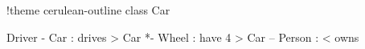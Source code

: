 \documentclass{scrartcl}
\begin{document}
\begin{plantuml}
!theme cerulean-outline
class Car

Driver - Car : drives >
Car *- Wheel : have 4 >
Car -- Person : < owns
\end{plantuml}
\end{document}
